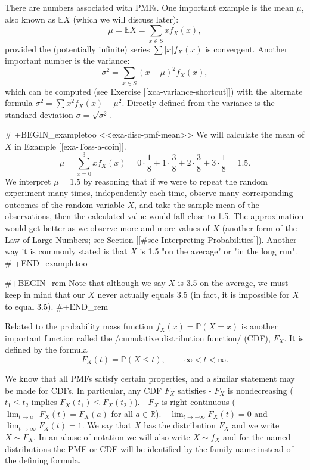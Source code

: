 There are numbers associated with PMFs. One important example is the
mean \(\mu\), also known as \(\mathbb{E} X\) (which we will discuss
later):
\begin{equation}
\mu=\mathbb{E} X=\sum_{x\in S}xf_{X}(x),
\end{equation}
provided the (potentially infinite) series \(\sum|x|f_{X}(x)\) is convergent. Another important number is the variance:
\begin{equation}
\sigma^{2}=\sum_{x\in S}(x-\mu)^{2}f_{X}(x),
\end{equation}
which can be computed (see Exercise [[xca-variance-shortcut]]) with the
alternate formula \(\sigma^{2}=\sum
x{}^{2}f_{X}(x)-\mu^{2}\). Directly defined from the variance is the
standard deviation \(\sigma=\sqrt{\sigma^{2}}\).
 
# +BEGIN_exampletoo
<<exa-disc-pmf-mean>> We will calculate the mean of \(X\) in Example
[[exa-Toss-a-coin]].  \[ \mu = \sum_{x = 0}^{3}xf_{X}(x) = 0 \cdot
\frac{1}{8} + 1 \cdot \frac{3}{8} + 2 \cdot
\frac{3}{8}+3\cdot\frac{1}{8} = 1.5. \] We interpret \(\mu = 1.5\) by
reasoning that if we were to repeat the random experiment many times,
independently each time, observe many corresponding outcomes of the
random variable \(X\), and take the sample mean of the observations,
then the calculated value would fall close to 1.5. The approximation
would get better as we observe more and more values of \(X\) (another
form of the Law of Large Numbers; see Section
[[#sec-Interpreting-Probabilities]]). Another way it is commonly stated is
that \(X\) is 1.5 "on the average" or "in the long run".
# +END_exampletoo


#+BEGIN_rem
Note that although we say \(X\) is 3.5 on the average, we must keep in
mind that our \(X\) never actually equals 3.5 (in fact, it is
impossible for \(X\) to equal 3.5).
#+END_rem

Related to the probability mass function \(f_{X}(x)=\mathbb{P}(X=x)\)
is another important function called the /cumulative distribution
function/ (CDF), \(F_{X}\). It is defined by the formula
\begin{equation}
F_{X}(t)=\mathbb{P}(X\leq t),\quad -\infty < t < \infty.
\end{equation}

We know that all PMFs satisfy certain properties, and a similar
statement may be made for CDFs. In particular, any CDF \(F_{X}\)
satisfies
- \(F_{X}\) is nondecreasing (\(t_{1}\leq t_{2}\) implies
  \(F_{X}(t_{1})\leq F_{X}(t_{2})\)).
- \(F_{X}\) is right-continuous (\(\lim_{t\to
  a^{+}}F_{X}(t)=F_{X}(a)\) for all \(a\in\mathbb{R}\)).
- \(\lim_{t\to-\infty}F_{X}(t)=0\) and
  \(\lim_{t\to\infty}F_{X}(t)=1\).
We say that \(X\) has the distribution \(F_{X}\) and we write \(X\sim
F_{X}\). In an abuse of notation we will also write \(X\sim f_{X}\)
and for the named distributions the PMF or CDF will be identified by
the family name instead of the defining formula.


